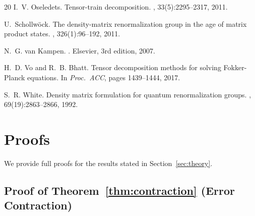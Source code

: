 \documentclass[11pt]{article}
\begin{document}
\begin{thebibliography}{20}
I.~V. Oseledets.
\newblock Tensor-train decomposition.
, 33(5):2295--2317, 2011.

U.~Schollw{\"o}ck.
\newblock The density-matrix renormalization group in the age of matrix
  product states.
, 326(1):96--192, 2011.

N.~G. van Kampen.
.
\newblock Elsevier, 3rd edition, 2007.

H.~D. Vo and R.~B. Bhatt.
\newblock Tensor decomposition methods for solving {F}okker-{P}lanck
  equations.
\newblock In {\em Proc.\ ACC}, pages 1439--1444, 2017.

S.~R. White.
\newblock Density matrix formulation for quantum renormalization groups.
, 69(19):2863--2866, 1992.

\end{thebibliography}

\appendix

\section{Proofs}\label{app:proofs}

We provide full proofs for the results stated in Section~\ref{sec:theory}.

\subsection{Proof of Theorem~\ref{thm:contraction} (Error Contraction)}
\end{document}
